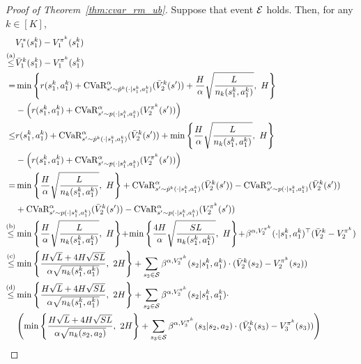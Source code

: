 \begin{proof}[Proof of Theorem~\ref{thm:cvar_rm_ub}]
	Suppose that event $\mathcal{E}$ holds. Then, for any $k \in [K]$,
	\begin{align}
		& V^{*}_1(s^k_1)-V^{\pi^k}_1(s^k_1)
		\nonumber\\
		\overset{\textup{(a)}}{\leq} & \bar{V}^k_1(s^k_1)-V^{\pi^k}_1(s^k_1)
		\nonumber\\
		= & \min \lbr{r(s^k_1,a^k_1) + \cvar^{\alpha}_{s' \sim \hat{p}^k(\cdot|s^k_1,a^k_1)}(\bar{V}^k_{2}(s')) + \frac{H}{\alpha}\sqrt{\frac{L}{n_k(s^k_1,a^k_1)}},\ H} 
		\nonumber\\ & - \sbr{r(s^k_1,a^k_1) + \cvar^{\alpha}_{s' \sim p(\cdot|s^k_1,a^k_1)}(V^{\pi^k}_{2}(s'))}
		\nonumber\\
		\leq & r(s^k_1,a^k_1) + \cvar^{\alpha}_{s' \sim \hat{p}^k(\cdot|s^k_1,a^k_1)}(\bar{V}^k_{2}(s')) + \min \lbr{\frac{H}{\alpha}\sqrt{\frac{L}{n_k(s^k_1,a^k_1)}},\ H} 
		\nonumber\\ & - \sbr{r(s^k_1,a^k_1) + \cvar^{\alpha}_{s' \sim p(\cdot|s^k_1,a^k_1)}(V^{\pi^k}_{2}(s'))}
		\nonumber\\
		= & \min \lbr{\frac{H}{\alpha}\sqrt{\frac{L}{n_k(s^k_1,a^k_1)}},\ H} + \cvar^{\alpha}_{s' \sim \hat{p}^k(\cdot|s^k_1,a^k_1)}(\bar{V}^k_{2}(s')) - \cvar^{\alpha}_{s' \sim p(\cdot|s^k_1,a^k_1)}(\bar{V}^k_{2}(s')) \nonumber\\& + \cvar^{\alpha}_{s' \sim p(\cdot|s^k_1,a^k_1)}(\bar{V}^k_{2}(s')) - \cvar^{\alpha}_{s' \sim p(\cdot|s^k_1,a^k_1)}(V^{\pi^k}_{2}(s'))
		\nonumber\\
		\overset{\textup{(b)}}{\leq} & \min \lbr{\frac{H}{\alpha}\sqrt{\frac{L}{n_k(s^k_1,a^k_1)}},\ H} \!+\! \min \lbr{\frac{4H}{\alpha} \sqrt{\frac{SL}{n_k(s^k_1,a^k_1)}},\ H} \!+\! \beta^{\alpha,V^{\pi^k}_2}(\cdot|s^k_1,a^k_1)^\top (\bar{V}^k_2-V^{\pi^k}_2)
		\nonumber\\
		\overset{\textup{(c)}}{\leq} & \min \lbr{\frac{H\sqrt{L}+4H\sqrt{SL}}{\alpha \sqrt{n_k(s^k_1,a^k_1)}},\ 2H} +\sum_{s_2 \in \mathcal{S}} \beta^{\alpha,V^{\pi^k}_2}(s_2|s^k_1,a^k_1) \cdot (\bar{V}^k_2(s_2)-V^{\pi^k}_2(s_2))
		\nonumber\\
		\overset{\textup{(d)}}{\leq} & \min \lbr{\frac{H\sqrt{L}+4H\sqrt{SL}}{\alpha \sqrt{n_k(s^k_1,a^k_1)}},\ 2H} +\sum_{s_2 \in \mathcal{S}} \beta^{\alpha,V^{\pi^k}_2}(s_2|s^k_1,a^k_1) \cdot \nonumber\\& \left( \min \lbr{\frac{H\sqrt{L}+4H\sqrt{SL}}{\alpha \sqrt{n_k(s_2,a_2)}},\ 2H} +  \sum_{s_3 \in \mathcal{S}} \beta^{\alpha,V^{\pi^k}_3}(s_3|s_2,a_2) \cdot (\bar{V}^k_3(s_3) - V^{\pi^k}_3(s_3)) \right)

\end{align}
\end{proof}
